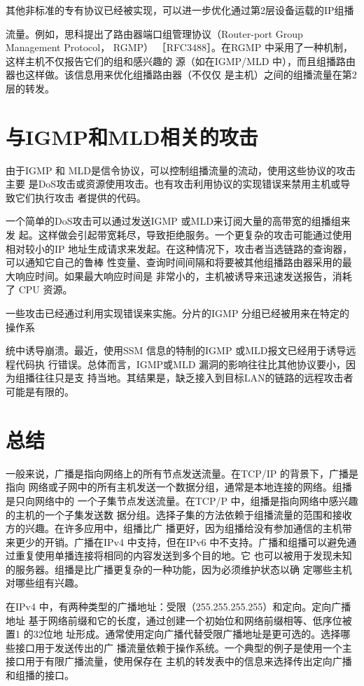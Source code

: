 其他非标准的专有协议已经被实现，可以进一步优化通过第2层设备运载的IP组播

流量。例如，思科提出了路由器端口组管理协议（Router-port Group Management Protocol，
RGMP） ［RFC3488］。在RGMP 中采用了一种机制，这样主机不仅报告它们的组和感兴趣的
源（如在IGMP/MLD 中），而且组播路由器也这样做。该信息用来优化组播路由器（不仅仅
是主机）之间的组播流量在第2层的转发。

\section{与IGMP和MLD相关的攻击}

由于IGMP 和 MLD是信令协议，可以控制组播流量的流动，使用这些协议的攻击主要
是DoS攻击或资源使用攻击。也有攻击利用协议的实现错误来禁用主机或导致它们执行攻击
者提供的代码。

一个简单的DoS攻击可以通过发送IGMP 或MLD来订阅大量的高带宽的组播组来发
起。这样做会引起带宽耗尽，导致拒绝服务。一个更复杂的攻击可能通过使用相对较小的IP
地址生成请求来发起。在这种情况下，攻击者当选链路的查询器，可以通知它自己的鲁棒
性变量、查询时间间隔和将要被其他组播路由器采用的最大响应时间。如果最大响应时间是
非常小的，主机被诱导来迅速发送报告，消耗了 CPU 资源。

一些攻击已经通过利用实现错误来实施。分片的IGMP 分组已经被用来在特定的操作系

统中诱导崩溃。最近，使用SSM 信息的特制的IGMP 或MLD报文已经用于诱导远程代码执
行错误。总体而言，IGMP或MLD 漏洞的影响往往比其他协议要小，因为组播往往只是支
持当地。其结果是，缺乏接入到目标LAN的链路的远程攻击者可能是有限的。

\section{总结}

一般来说，广播是指向网络上的所有节点发送流量。在TCP/IP 的背景下，广播是指向
网络或子网中的所有主机发送一个数据分组，通常是本地连接的网络。组播是只向网络中的
一个子集节点发送流量。在TCP/P 中，组播是指向网络中感兴趣的主机的一个子集发送数
据分组。选择子集的方法依赖于组播流量的范围和接收方的兴趣。在许多应用中，组播比广
播更好，因为组播给没有参加通信的主机带来更少的开销。广播在IPv4 中支持，但在IPv6
中不支持。广播和组播可以避免通过重复使用单播连接将相同的内容发送到多个目的地。它
也可以被用于发现未知的服务器。组播是比广播更复杂的一种功能，因为必须维护状态以确
定哪些主机对哪些组有兴趣。

在IPv4 中，有两种类型的广播地址：受限（255.255.255.255）和定向。定向广播地址
基于网络前缀和它的长度，通过创建一个初始位和网络前缀相等、低序位被置1 的32位地
址形成。通常使用定向广播代替受限广播地址是更可选的。选择哪些接口用于发送传出的广
播流量依赖于操作系统。一个典型的例子是使用一个主接口用于有限广播流量，使用保存在
主机的转发表中的信息来选择传出定向广播和组播的接口。

